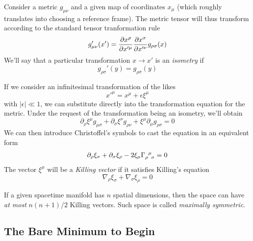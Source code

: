 Consider a metric $g_{\mu\nu}$ and a given map of coordinates $x_{\mu}$ (which roughly translates into choosing a reference frame). The metric tensor will thus transform according to the standard tensor tranformation rule
\begin{equation}
    g_{\mu\nu}'(x') = \frac{\partial x^{\rho}}{\partial x'^{\mu}}\frac{\partial x^{\sigma}}{\partial x'^{\nu}}g_{\rho\sigma}(x)
\end{equation}
We'll say that a particular transformation $x \to x'$ is an \emph{isometry} if 
\begin{equation}
    g_{\rho\sigma}'(y) = g_{\rho\sigma}(y)
\end{equation}
\par If we consider an infinitesimal transformation of the likes
\begin{equation}
    x'^{\mu} = x^{\mu} + \epsilon \xi^{\mu}
\end{equation}
with $|\epsilon| \ll 1$, we can substitute directly into the transformation equation for the metric. Under the request of the transformation being an isometry, we'll obtain
\begin{equation}
    \partial_{\rho}\xi^{\mu}g_{\mu\sigma} + \partial_{\sigma}\xi^{\nu}g_{\rho\nu} + \xi^{\mu}\partial_{\mu}g_{\rho\sigma} = 0
\end{equation}
We can then introduce Christoffel's symbols to cast the equation in an equivalent form
\begin{equation}
    \partial_{\rho}\xi_{\sigma} + \partial_{\sigma}\xi_{\rho} - 2\xi_{\mu}\Gamma_{\rho\;\;\sigma}^{\;\;\mu} = 0
\end{equation}
The vector $\xi^{\mu}$ will be a \emph{Killing vector} if it satisfies Killing's equation
\begin{equation}
    \nabla_{\rho}\xi_{\sigma} + \nabla_{\sigma}\xi_{\rho} = 0
\end{equation}
\par If a given spacetime manifold has $n$ spatial dimensions, then the space can have \emph{at most} $n(n+1)/2$ Killing vectors. Such space is called \emph{maximally symmetric}.

\subsection{The Bare Minimum to Begin}

